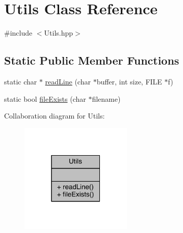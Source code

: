 \hypertarget{class_utils}{\section{Utils Class Reference}
\label{class_utils}
}


{\ttfamily \#include $<$Utils.\+hpp$>$}

\subsection*{Static Public Member Functions}
\begin{DoxyCompactItemize}
\item 
static char $\ast$ \hyperlink{class_utils_a17c24306d2379f9ec58e01b964c9f4cb}{read\+Line} (char $\ast$buffer, int size, F\+I\+L\+E $\ast$f)
\item 
static bool \hyperlink{class_utils_a47da16ce68ce717a1ca610af28de99a2}{file\+Exists} (char $\ast$filename)
\end{DoxyCompactItemize}


Collaboration diagram for Utils\+:
\nopagebreak
\begin{figure}[H]
\begin{center}
\leavevmode
\includegraphics[width=151pt]{class_utils__coll__graph}
\end{center}
\end{figure}


